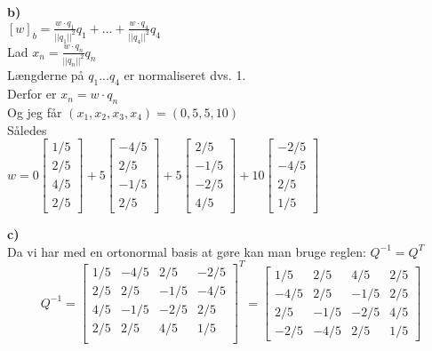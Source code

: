 \documentclass[12pt]{article}
\begin{document}
{\textbf{b)}\\

$[w]_b = \frac{w \cdot q_1}{||q_1||^2} q_1 + ... + \frac{w \cdot q_4}{||q_4||^2} q_4 $\\

Lad $x_n =  \frac{w \cdot q_n}{||q_n||^2} q_n $\\

Længderne på $q_1 ... q_4$ er normaliseret dvs. 1.\\

Derfor er $x_n = w \cdot q_n  $ \\

Og jeg får $(x_1, x_2, x_3, x_4) = (0, 5, 5, 10)$\\

Således\\

 $w = 
0 \begin{bmatrix} 1/5\\2/5\\4/5\\2/5 \end{bmatrix}+
5 \begin{bmatrix} -4/5\\2/5\\-1/5\\2/5 \end{bmatrix}+
5 \begin{bmatrix} 2/5\\-1/5\\-2/5\\4/5 \end{bmatrix}+
10 \begin{bmatrix} -2/5\\-4/5\\2/5\\1/5 \end{bmatrix}$

\textbf{c)}\\

Da vi har med en ortonormal basis at gøre kan man bruge reglen: $Q^{-1} = Q^T$
\[
Q^{-1} =
\begin{bmatrix}
1/5 & -4/5 & 2/5 & -2/5\\
2/5 & 2/5 &-1/5 & -4/5\\
4/5 & -1/5 & -2/5 & 2/5 \\
2/5 & 2/5 & 4/5 & 1/5\\
\end{bmatrix}^T = 
\begin{bmatrix}
1/5 & 2/5 & 4/5 & 2/5 \\
-4/5 & 2/5 & -1/5 & 2/5\\
2/5 & -1/5 & -2/5 & 4/5\\
-2/5 & -4/5 & 2/5 & 1/5
\end{bmatrix} 
\]

}
\end{document}
